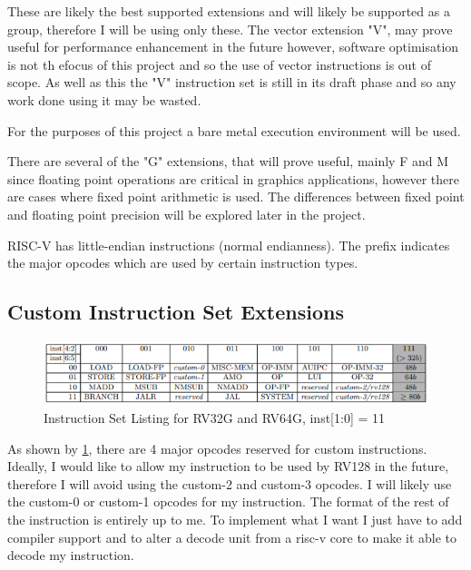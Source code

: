 These are likely the best supported extensions and will likely be supported as a group, therefore I will be using only these. The vector extension "V", may prove useful for performance enhancement in the future however, software optimisation is not th efocus of this project and so the use of vector instructions is out of scope. As well as this the "V" instruction set is still in its draft phase and so any work done using it may be wasted.

For the purposes of this project a bare metal execution environment will be used.

There are several of the "G" extensions, that will prove useful, mainly F and M since floating point operations are critical in graphics applications, however there are cases where fixed point arithmetic is used. The differences between fixed point and floating point precision will be explored later in the project.

RISC-V has little-endian instructions (normal endianness). The prefix indicates the major opcodes which are used by certain instruction types. 
\subsection{Custom Instruction Set Extensions}

\begin{figure}[ht]
    \centering
    \includegraphics{lit_review/images/RV32G_64G_InstructionSetTable.png}
    \caption{Instruction Set Listing for RV32G and RV64G, inst[1:0] = 11}
    \label{fig:RV32G_64G_InstructionSetTable}
\end{figure}
As shown by \ref{fig:RV32G_64G_InstructionSetTable}, there are 4 major opcodes reserved for custom instructions. Ideally, I would like to allow my instruction to be used by RV128 in the future, therefore I will avoid using the custom-2 and custom-3 opcodes. 
I will likely use the custom-0 or custom-1 opcodes for my instruction. The format of the rest of the instruction is entirely up to me. To implement what I want I just have to add compiler support and to alter a decode unit from a risc-v core to make it able to decode my instruction.


